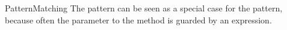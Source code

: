 \begin{pattern}{PatternMatching}
\related{}
The  pattern can be seen as a special case for the \thisp{} pattern,
because often the parameter to the  method is guarded by an  expression.
\end{pattern}
